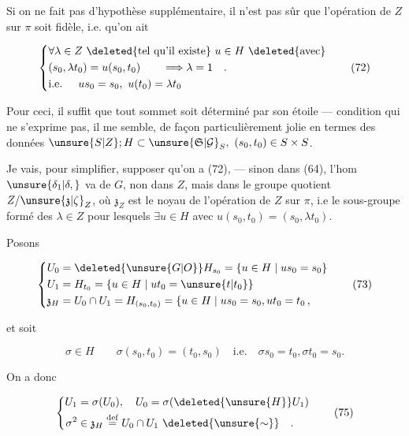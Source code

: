 Si on ne fait pas d'hypothèse supplémentaire, il n'est pas sûr que l'opération de $Z$ sur $\pi$ soit fidèle, i.e. qu'on ait

\[
\left\{\begin{aligned}
&\forall\lambda\in Z\ \deleted{\text{tel qu'il existe}}\ u\in H\ \deleted{\text{avec}}\\
&(s_0,\lambda t_0)=u(s_0,t_0)\qquad\Longrightarrow\lambda=1\quad.\\
&\text{i.e. }\quad us_0=s_0,\ u(t_0)=\lambda t_0
\end{aligned}\right.
\tag*{(72)}
\]

Pour ceci, il suffit que tout sommet soit déterminé par son étoile --- condition qui ne s'exprime pas, il me semble, de façon particulièrement jolie en termes des données $\unsure{S|Z};H\subset\unsure{\mathfrak S|\mathcal G}_S,\ (s_0,t_0)\in S\times S$.

Je vais, pour simplifier, supposer qu'on a (72), --- sinon dans (64), l'hom $\unsure{\delta_1|\delta,}$ va de  $G$, non dans $Z$, mais dans le groupe quotient $Z/\unsure{\mathfrak z|\zeta}_Z$, où $\mathfrak z_Z$ est le noyau de l'opération de $Z$ sur $\pi$, i.e le sous-groupe formé des $\lambda\in Z$ pour lesquels $\exists u\in H$ avec $u(s_0,t_0)=(s_0,\lambda t_0)$.

Posons

\[
\left\{\begin{aligned}
U_0&=\deleted{\unsure{G|O}}H_{s_0}=\{u\in H\mid us_0=s_0\}\\
U_1&=H_{t_0}=\{u\in H\mid ut_0=\unsure{t|t_0}\}\\
\mathfrak z_H&=U_0\cap U_1=H_{(s_0,t_0)}=\{u\in H\mid us_0=s_0,ut_0=t_0\,,
\end{aligned}\right.
\tag*{(73)}
\]

et soit

\[
\sigma\in H\qquad\sigma(s_0,t_0)=(t_0,s_0)\quad\text{i.e.}\quad\sigma s_0=t_0,\sigma t_0=s_0.
\tag*{(74)}
\]

On a donc

\[
\left\{\begin{aligned}
U_1&=\sigma(U_0),\quad U_0=\sigma(\deleted{\unsure{H}}U_1)\\
\sigma^2&\in\mathfrak z_H\overset{\mathrm{def}}{=}U_0\cap U_1\ \deleted{\unsure{\sim}}\quad.
\end{aligned}\right.
\tag*{(75)}
\]


